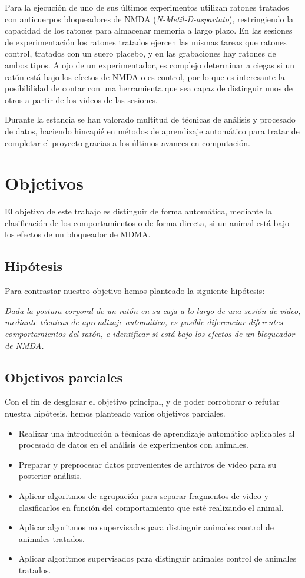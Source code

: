 Para la ejecución de uno de sus últimos experimentos utilizan ratones tratados con anticuerpos bloqueadores de NMDA (\textit{N-Metil-D-aspartato}), restringiendo la capacidad de los ratones para almacenar memoria a largo plazo. En las sesiones de experimentación los ratones tratados ejercen las mismas tareas que ratones control, tratados con un suero placebo, y en las grabaciones hay ratones de ambos tipos. A ojo de un experimentador, es complejo determinar a ciegas si un ratón está bajo los efectos de NMDA o es control, por lo que es interesante la posibililidad de contar con una herramienta que sea capaz de distinguir unos de otros a partir de los videos de las sesiones.

Durante la estancia se han valorado multitud de técnicas de análisis y procesado de datos, haciendo hincapié en métodos de aprendizaje automático para tratar de completar el proyecto gracias a los últimos avances en computación.

\section{Objetivos} \label{sec:objetivos}
El objetivo de este trabajo es distinguir de forma automática, mediante la clasificación de los comportamientos o de forma directa, si un animal está bajo los efectos de un bloqueador de MDMA.

\subsection{Hipótesis}
Para contrastar nuestro objetivo hemos planteado la siguiente hipótesis:

\textit{Dada la postura corporal de un ratón en su caja a lo largo de una sesión de video, mediante técnicas de aprendizaje automático, es posible diferenciar diferentes comportamientos del ratón, e identificar si está bajo los efectos de un bloqueador de NMDA.}

\subsection{Objetivos parciales}
Con el fin de desglosar el objetivo principal, y de poder corroborar o refutar nuestra hipótesis, hemos planteado varios objetivos parciales.

\begin{itemize}
    \item Realizar una introducción a técnicas de aprendizaje automático aplicables al procesado de datos en el análisis de experimentos con animales.
    \item Preparar y preprocesar datos provenientes de archivos de video para su posterior análisis.
    \item Aplicar algoritmos de agrupación para separar fragmentos de video y clasificarlos en función del comportamiento que esté realizando el animal.
    \item Aplicar algoritmos no supervisados para distinguir animales control de animales tratados.
    \item Aplicar algoritmos supervisados para distinguir animales control de animales tratados.
\end{itemize}


